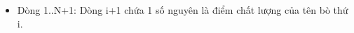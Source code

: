 \begin{itemize}
	\item     Dòng 1..N+1: Dòng i+1 chứa 1 số nguyên là điểm chất lượng của tên bò thứ i.   
\end{itemize}